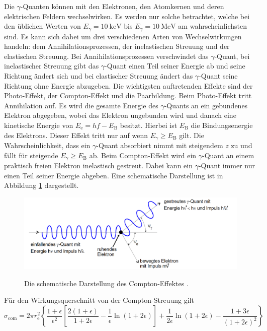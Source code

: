 Die $\gamma$-Quanten können mit den Elektronen, den Atomkernen und deren elektrischen Feldern wechselwirken. Es werden nur solche betrachtet, welche bei den üblichen Werten von $E_\gamma = \SI{10}{\kilo\electronvolt}$ bis $E_\gamma = \SI{10}{\mega\electronvolt}$ \cite{V704} am wahrscheinlichsten sind. Es kann sich dabei um drei verschiedenen Arten von Wechselwirkungen handeln: dem Annihilationsprozessen, der inelastischen Streuung und der elastischen Streuung. Bei Annihilationsprozessen verschwindet das $\gamma$-Quant, bei inelastischer Streuung gibt das $\gamma$-Quant einen Teil seiner Energie ab und seine Richtung ändert sich und bei elastischer Streuung ändert das $\gamma$-Quant seine Richtung ohne Energie abzugeben. Die wichtigsten auftretenden Effekte sind der Photo-Effekt, der Compton-Effekt und die Paarbildung.
Beim Photo-Effekt tritt Annihilation auf. Es wird die gesamte Energie des $\gamma$-Quants an ein gebundenes Elektron abgegeben, wobei das Elektron ungebunden wird und danach eine kinetische Energie von $E_\text{e} = h f - E_\text{B}$ besitzt. Hierbei ist $E_\text{B}$ die Bindungsenergie des Elektrons. Dieser Effekt tritt nur auf wenn $E_\gamma \ge E_\text{B}$ gilt. Die Wahrscheinlichkeit, dass ein $\gamma$-Quant absorbiert nimmt mit steigendem $z$ zu und fällt für steigende $E_\gamma \ge E_\text{B}$ ab. 
Beim Compton-Effekt wird ein $\gamma$-Quant an einem praktisch freien Elektron inelastisch gestreut. Dabei kann ein $\gamma$-Quant immer nur einen Teil seiner Energie abgeben. Eine schematische Darstellung ist in Abbildung \ref{fig:com} dargestellt.
\begin{figure}
	\centering
	\caption{Die schematische Darstellung des Compton-Effektes \cite{V704}.}
	\includegraphics[width=\linewidth,height=\textheight-170pt,keepaspectratio]{content/images/com.png}
	\label{fig:com}
\end{figure}
Für den Wirkungsquerschnitt von der Compton-Streuung gilt
\begin{equation}
\sigma_\text{com} = 2 \pi r_\text{e}^2 \left\{ \frac{1+\epsilon}{\epsilon^2} \left[\frac{2 (1+\epsilon)}{1+2 \epsilon} -\frac{1}{\epsilon} \ln(1+ 2 \epsilon)\right] + \frac{1}{2 \epsilon} \ln(1 + 2 \epsilon) -\frac{1 + 3 \epsilon}{(1+2\epsilon)^2} \right\}\label{eq:HJHJ}
\end{equation}
